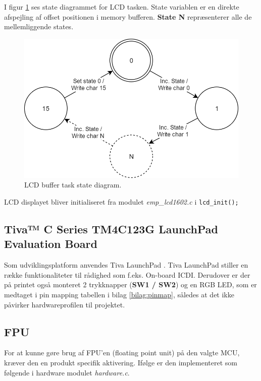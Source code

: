 I figur \ref{fig:lcd_task} ses state diagrammet for LCD tasken. State variablen er en direkte afspejling af offset positionen i memory bufferen. \textbf{State N} repræsenterer alle de mellemliggende states.

\begin{figure}[h!]
	\centering
	\includegraphics[width=.6\textwidth]{billeder/lcd_task.png}
	\caption{LCD buffer task state diagram.}
	\label{fig:lcd_task}
\end{figure}

LCD displayet bliver initialiseret fra modulet \textit{emp\_lcd1602.c} i  \texttt{lcd\_init();}
  
\FloatBlock

\subsection{Tiva™ C Series TM4C123G LaunchPad Evaluation Board}
Som udviklingsplatform anvendes Tiva LaunchPad \cite{spmu296}. 
Tiva LaunchPad stiller en række funktionaliteter til rådighed som f.eks. On-board ICDI.
Derudover er der på printet også monteret 2 trykknapper (\textbf{SW1 / SW2}) og en RGB LED, som er medtaget i pin mapping tabellen i bilag \ref{bilag:pinmap}, således at det ikke påvirker hardwareprofilen til projektet.   

\subsection{FPU}
For at kunne gøre brug af FPU'en (floating point unit) på den valgte MCU, kræver den en produkt specifik aktivering.
Ifølge \cite[afsnit 3.1.5.7 s. 132]{tm4c123gh6pm} er den implementeret som følgende i hardware modulet \textit{hardware.c}.

